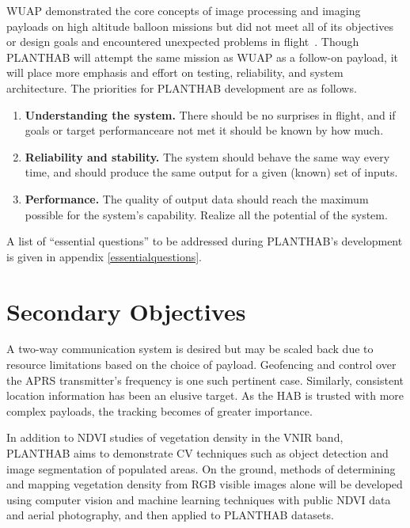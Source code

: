 \documentclass[conference]{IEEEtran} %
\begin{document}
WUAP demonstrated the core concepts of image processing and imaging payloads on high altitude balloon missions but did not meet all of its objectives or design goals and encountered unexpected problems in flight~\cite[Post-Flight Analysis]{wuaphab4}.
Though PLANTHAB will attempt the same mission as WUAP as a follow-on payload, it will place more emphasis and effort on testing, reliability, and system architecture.
The priorities for PLANTHAB development are as follows.
\begin{enumerate}\small
    \item \textbf{Understanding the system.} There should be no surprises in flight, and if goals or target performanceare not met it should be known by how much.
    \item \textbf{Reliability and stability.} The system should behave the same way every time, and should produce the same output for a given (known) set of inputs.
    \item \textbf{Performance.} The quality of output data should reach the maximum possible for the system's capability. Realize all the potential of the system.
\end{enumerate}

A list of ``essential questions'' to be addressed during PLANTHAB's development is given in appendix \ref{essentialquestions}.


\section{Secondary Objectives}
\label{secondaryobjectives}
A two-way communication system is desired but may be scaled back due to resource limitations based on the choice of payload. Geofencing and control over the APRS transmitter's frequency is one such pertinent case.
Similarly, consistent location information has been an elusive target.
As the HAB is trusted with more complex payloads, the tracking becomes of greater importance.

In addition to NDVI studies of vegetation density in the VNIR band, PLANTHAB aims to demonstrate CV techniques such as object detection and image segmentation of populated areas.
On the ground, methods of determining and mapping vegetation density from RGB visible images alone will be developed using computer vision and machine learning techniques with public NDVI data and aerial photography, and then applied to PLANTHAB datasets.
\end{document}
